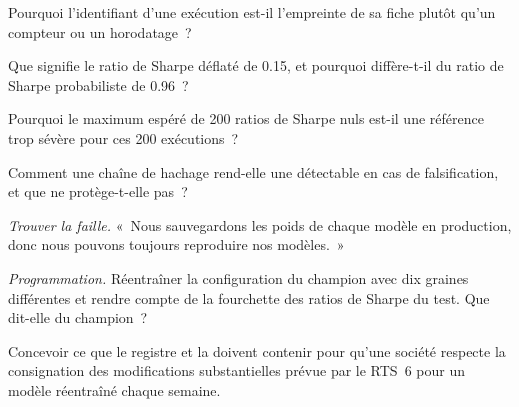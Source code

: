 \begin{exercise}[$\star$]\label{exo:ml:experiment-tracking-and-reproducibility:2}
Pourquoi l'identifiant d'une exécution est-il l'empreinte de sa fiche plutôt qu'un compteur ou un horodatage~?
\end{exercise}

\begin{exercise}[$\star$]\label{exo:ml:experiment-tracking-and-reproducibility:3}
Que signifie le ratio de Sharpe déflaté de 0.15, et pourquoi diffère-t-il du ratio de Sharpe probabiliste de 0.96~?
\end{exercise}

\begin{exercise}[$\star\star$]\label{exo:ml:experiment-tracking-and-reproducibility:4}
Pourquoi le maximum espéré de 200 ratios de Sharpe nuls est-il une référence trop sévère pour ces 200 exécutions~?
\end{exercise}

\begin{exercise}[$\star\star$]\label{exo:ml:experiment-tracking-and-reproducibility:5}
Comment une chaîne de hachage rend-elle une  détectable en cas de falsification, et que ne protège-t-elle pas~?
\end{exercise}

\begin{exercise}[$\star\star$]\label{exo:ml:experiment-tracking-and-reproducibility:6}
\emph{Trouver la faille.} «~Nous sauvegardons les poids de chaque modèle en production, donc nous pouvons toujours reproduire nos modèles.~»
\end{exercise}

\begin{exercise}[$\star\star\star$]\label{exo:ml:experiment-tracking-and-reproducibility:7}
\emph{Programmation.} Réentraîner la configuration du champion avec dix graines différentes et rendre compte de la fourchette des ratios de Sharpe du test.
Que dit-elle du champion~?
\end{exercise}

\begin{exercise}[$\star\star\star$]\label{exo:ml:experiment-tracking-and-reproducibility:8}
Concevoir ce que le registre et la  doivent contenir pour qu'une société respecte la consignation des modifications substantielles prévue par le RTS~6 pour un modèle
réentraîné chaque semaine.
\end{exercise}

